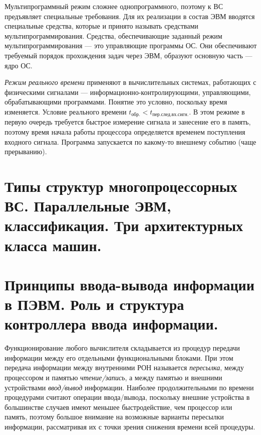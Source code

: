 \documentclass[unicode, 12pt, a4paper, oneside]{article}
\begin{document}
Мультипрограммный режим сложнее однопрограммного, поэтому к ВС предъявляет специальные требования. Для их реализации в состав ЭВМ вводятся специальные средства, которые и принято называть средствами мультипрограммирования. Средства, обеспечивающие заданный режим мультипрограммирования --- это управляющие программы ОС. Они обеспечивают требуемый порядок прохождения задач через ЭВМ, образуют основную часть --- ядро ОС.

\textit{Режим реального времени} применяют в вычислительных системах, работающих с физическими сигналами --- информационно-контролирующими, управляющими, обрабатывающими программами. Понятие это условно, поскольку время изменяется. Условие реального времени $ t_\text{обр.} < t_\text{пер.след.вх.сигн.}$. В этом режиме в первую очередь требуется быстрое измерение сигнала и занесение его в память, поэтому время начала работы процессора определяется временем поступления входного сигнала. Программа запускается по какому-то внешнему событию (чаще прерыванию).


\section{Типы структур многопроцессорных ВС. Параллельные ЭВМ, классификация. Три архитектурных класса машин.}

\section{Принципы ввода-вывода информации в ПЭВМ. Роль и структура контроллера ввода информации.}

Функционирование любого вычислителя складывается из процедур передачи информации между его отдельными функциональными блоками. При этом передача информации между внутренними РОН называется \textit{пересылка}, между процессором и памятью \textit{чтение/запись}, а между памятью и внешними устройствами \textit{ввод/вывод} информации. Наиболее продолжительными по времени процедурами считают операции ввода/вывода, поскольку внешние устройства в большинстве случаев имеют меньшее быстродействие, чем процессор или память, поэтому большое внимание на возможные варианты пересылки информации, рассматривая их с точки зрения снижения времени всей процедуры.
\end{document}
